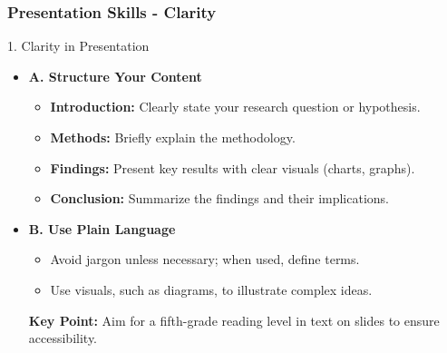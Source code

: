 \documentclass[aspectratio=169]{beamer}
\begin{document}
\begin{frame}[fragile]
    \frametitle{Presentation Skills - Clarity}
    \begin{block}{1. Clarity in Presentation}
        \begin{itemize}
            \item \textbf{A. Structure Your Content}
            \begin{itemize}
                \item \textbf{Introduction:} Clearly state your research question or hypothesis.
                \item \textbf{Methods:} Briefly explain the methodology.
                \item \textbf{Findings:} Present key results with clear visuals (charts, graphs).
                \item \textbf{Conclusion:} Summarize the findings and their implications.
            \end{itemize}

            \item \textbf{B. Use Plain Language}
            \begin{itemize}
                \item Avoid jargon unless necessary; when used, define terms.
                \item Use visuals, such as diagrams, to illustrate complex ideas.
            \end{itemize}
            \textbf{Key Point:} Aim for a fifth-grade reading level in text on slides to ensure accessibility.
        \end{itemize}
    \end{block}
\end{frame}
\end{document}
